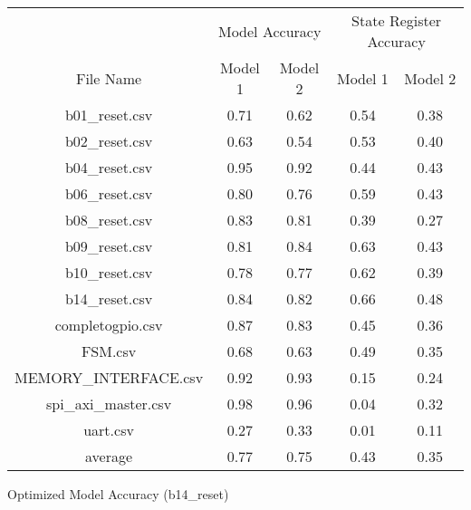 \bigskip\begin{tabular}{|c|c|c|c|c|}
    \hline
     & \multicolumn{2}{c|}{Model Accuracy} & \multicolumn{2}{c|}{State Register Accuracy}\\
    \cline {2-5}
    File Name & Model 1 & Model 2 & Model 1 & Model 2 \\
    \hline
    \hline
    b01\_reset.csv & 0.71 & 0.62 & 0.54 & 0.38\\
    \hline
    b02\_reset.csv & 0.63 & 0.54 & 0.53 & 0.40\\
    \hline
    b04\_reset.csv & 0.95 & 0.92 & 0.44 & 0.43\\
    \hline
    b06\_reset.csv & 0.80 & 0.76 & 0.59 & 0.43\\
    \hline
    b08\_reset.csv & 0.83 & 0.81 & 0.39 & 0.27\\
    \hline
    b09\_reset.csv & 0.81 & 0.84 & 0.63 & 0.43\\
    \hline
    b10\_reset.csv & 0.78 & 0.77 & 0.62 & 0.39\\
    \hline
    b14\_reset.csv & 0.84 & 0.82 & 0.66 & 0.48\\
    \hline
    completogpio.csv & 0.87 & 0.83 & 0.45 & 0.36\\
    \hline
    FSM.csv & 0.68 & 0.63 & 0.49 & 0.35\\
    \hline
    MEMORY\_INTERFACE.csv & 0.92 & 0.93 & 0.15 & 0.24\\
    \hline
    spi\_axi\_master.csv & 0.98 & 0.96 & 0.04 & 0.32\\
    \hline
    uart.csv & 0.27 & 0.33 & 0.01 & 0.11\\
    \hline
    \hline
    average & 0.77 & 0.75 & 0.43 & 0.35\\
\hline
\end{tabular}
\caption{Optimized Model Accuracy (b14\_reset)}
\label{tab:Optimized Model Accuracy (b14)}